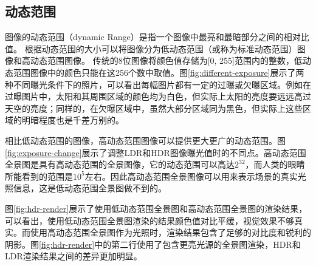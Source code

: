 \subsection{动态范围}

图像的动态范围（dynamic Range）是指一个图像中最亮和最暗部分之间的相对比值\cite{wikipedia}。
根据动态范围的大小可以将图像分为低动态范围（或称为标准动态范围）图像和高动态范围图像。
传统的8位图像将颜色值存储为[0, 255]范围内的整数，低动态范围图像中的颜色只能在这256个数中取值。图\ref{fig:different-exposure}展示了两种不同曝光条件下的照片，可以看出每幅图片都有一定的过曝或欠曝区域。例如在过曝图片中，太阳和其周围区域的颜色均为白色，但实际上太阳的亮度要远远高过天空的亮度；同样的，在欠曝区域中，虽然大部分区域同为黑色，但实际上这些区域的明暗程度也是千差万别的。


相比低动态范围的图像，高动态范围图像可以提供更大更广的动态范围。图\ref{fig:exposure-change}展示了调整LDR和HDR图像曝光值时的不同点。高动态范围全景图是具有高动态范围的全景图像，它的动态范围可以高达$2^{32}$，而人类的眼睛所能看到的范围是$10^5$左右\cite{wikipedia}。因此高动态范围全景图像可以用来表示场景的真实光照信息，这是低动态范围全景图做不到的。


图\ref{fig:hdr-render}展示了使用低动态范围全景图和高动态范围全景图的渲染结果，可以看出，使用低动态范围全景图渲染的结果颜色值对比平缓，视觉效果不够真实。而使用高动态范围全景图作为光照时，渲染结果包含了足够的对比度和锐利的阴影。图\ref{fig:hdr-render}中的第二行使用了包含更亮光源的全景图渲染，HDR和LDR渲染结果之间的差异更加明显。


